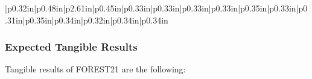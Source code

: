 \documentclass[
  11pt,
]{article}
\begin{document}
\begin{landscape}
\begin{longtable}[c]{|p{0.32in}|p{0.48in}|p{2.61in}|p{0.45in}|p{0.33in}|p{0.33in}|p{0.33in}|p{0.33in}|p{0.35in}|p{0.33in}|p{0.31in}|p{0.35in}|p{0.34in}|p{0.32in}|p{0.34in}|p{0.34in}}
 \\

\noalign{\global\setlength{\arrayrulewidth}{2pt}}

\end{longtable}

\end{landscape}

\clearpage

\hypertarget{expected-tangible-results}{%
\subsubsection{Expected Tangible
Results}\label{expected-tangible-results}}

Tangible results of FOREST21 are the following:
\end{document}
